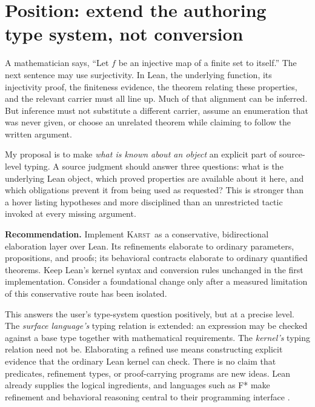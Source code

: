 \documentclass[11pt,letterpaper]{article}
\newcommand{\Karst}{\textsc{Karst}}
\theoremstyle{remark}
\begin{document}
\section{Position: extend the authoring type system, not conversion}\label{sec:position}

A mathematician says, ``Let $f$ be an injective map of a finite set to itself.''
The next sentence may use surjectivity. In Lean, the underlying function,
its injectivity proof, the finiteness evidence, the theorem relating these
properties, and the relevant carrier must all line up. Much of that alignment
can be inferred. But inference must not substitute a different carrier, assume
an enumeration that was never given, or choose an unrelated theorem while
claiming to follow the written argument.

My proposal is to make \emph{what is known about an object} an explicit part of
source-level typing. A source judgment should answer three questions:
what is the underlying Lean object, which proved properties are available about
it here, and which obligations prevent it from being used as requested?
This is stronger than a hover listing hypotheses and more disciplined than
an unrestricted tactic invoked at every missing argument.

\begin{decisionbox}
\textbf{Recommendation.} Implement \Karst\ as a conservative, bidirectional
elaboration layer over Lean. Its refinements elaborate to ordinary parameters,
propositions, and proofs; its behavioral contracts elaborate to ordinary
quantified theorems. Keep Lean's kernel syntax and conversion rules unchanged
in the first implementation. Consider a foundational change only after a
measured limitation of this conservative route has been isolated.
\end{decisionbox}

This answers the user's type-system question positively, but at a precise
level. The \emph{surface language's} typing relation is extended: an expression
may be checked against a base type together with mathematical requirements.
The \emph{kernel's} typing relation need not be. Elaborating a refined use means
constructing explicit evidence that the ordinary Lean kernel can check.
There is no claim that predicates, refinement types, or proof-carrying programs
are new ideas. Lean already supplies the logical ingredients, and languages
such as F* make refinement and behavioral reasoning central to their
programming interface \cite{leansubtypes,leantypes,fstarref,fstarintro}.
\end{document}
